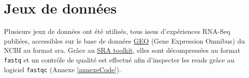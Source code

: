 \documentclass[12pt,a4paper]{report}
\begin{document}
\begin{onehalfspace}
\begin{figure}
\end{figure}

\section*{Jeux de données}
Plusieurs jeux de données ont été utilisés, tous issus d'expériences RNA-Seq publiées, accessibles sur le base de données \href{http://www.ncbi.nlm.nih.gov/geo/}{GEO} (Gene Expression Omnibus) du NCBI au format \gls{sra}. Grâce au \href{http://www.ncbi.nlm.nih.gov/books/NBK158900/#SRA_download.how_do_i_use_the_sra_toolki}{SRA toolkit}, elles sont décompressées au format \texttt{fastq} et un contrôle de qualité est effectué afin d'inspecter les reads grâce au logiciel \texttt{fastqc} (Annexe \ref{annexeCode}).


\end{onehalfspace}
\end{document}
